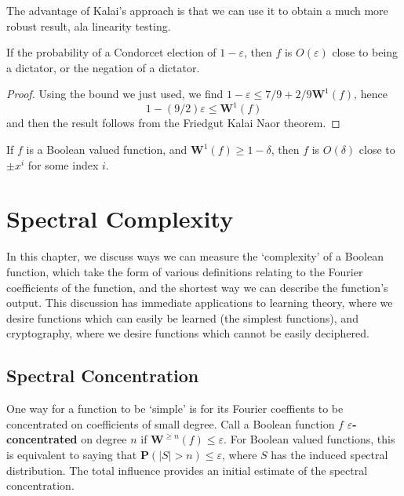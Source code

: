 The advantage of Kalai's approach is that we can use it to obtain a much more robust result, ala linearity testing.

\begin{theorem}
    If the probability of a Condorcet election of $1 - \varepsilon$, then $f$ is $O(\varepsilon)$ close to being a dictator, or the negation of a dictator.
\end{theorem}
\begin{proof}
    Using the bound we just used, we find $1 - \varepsilon \leq 7/9 + 2/9 \mathbf{W}^1(f)$, hence
    \[ 1 - (9/2) \varepsilon \leq \mathbf{W}^1(f) \]
    and then the result follows from the Friedgut Kalai Naor theorem.
\end{proof}

\begin{theorem}
    If $f$ is a Boolean valued function, and $\mathbf{W}^1(f) \geq 1 - \delta$, then $f$ is $O(\delta)$ close to $\pm x^i$ for some index $i$.
\end{theorem}








\chapter{Spectral Complexity}

In this chapter, we discuss ways we can measure the `complexity' of a Boolean function, which take the form of various definitions relating to the Fourier coefficients of the function, and the shortest way we can describe the function's output. This discussion has immediate applications to learning theory, where we desire functions which can easily be learned (the simplest functions), and cryptography, where we desire functions which cannot be easily deciphered.

\section{Spectral Concentration}

One way for a function to be `simple' is for its Fourier coeffients to be concentrated on coefficients of small degree. Call a Boolean function $f$ {\bf $\varepsilon$-concentrated} on degree $n$ if $\mathbf{W}^{\geq n}(f) \leq \varepsilon$. For Boolean valued functions, this is equivalent to saying that $\mathbf{P}(|S| > n) \leq \varepsilon$, where $S$ has the induced spectral distribution. The total influence provides an initial estimate of the spectral concentration.

